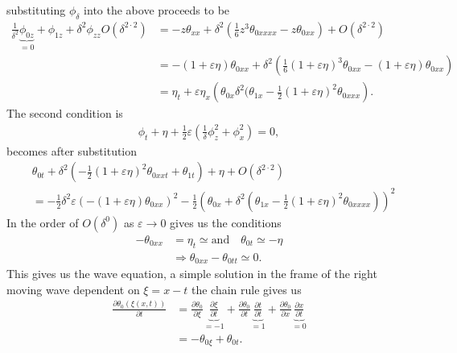 substituting $\phi_\delta$ into the above proceeds to be
\begin{align}
    \frac{1}{\delta^2}\underbrace{\phi_{0z}}_{=0} + \phi_{1z}+ \delta^2\phi_{zz}
    O(\delta^{2\cdot 2})
    &= -z\theta_{x x} + \delta^2\left( \frac{1}{6}z^3\theta_{0 x x x x} - z
    \theta_{0x x} \right) + O(\delta^{2\cdot 2})\\
    &=-(1+\varepsilon\eta)\theta_{0 x x} + \delta^2\left(
    \frac{1}{6}(1+\varepsilon\eta)^3\theta_{0 x x} -
(1+\varepsilon\eta)\theta_{0 x x} \right) \label{eq:soliton-scale-boundary1}\\
    &= \eta_t + \varepsilon\eta_x \left(
        \theta_{0x}
    \delta^2(\theta_{1x}-\frac{1}{2}( 1+ \varepsilon\eta)^2 \theta_{0x x
    x}\label{eq:soliton-scale-boundary2}
\right).
\end{align}
The second condition is
\begin{align}
    \phi_t + \eta + \frac{1}{2}\varepsilon \left( \frac{1}{\delta}\phi^2_z
    +\phi_x^2\right)  = 0,
\end{align}
becomes after substitution
\begin{align}
    &\theta_{0t}+ \delta^2\left( -\frac{1}{2}(1+\varepsilon\eta)^2\theta_{0 x xt}
    + \theta_{1t}\right) + \eta + O(\delta^{2\cdot 2})
\label{eq:soliton-scale-boundary3}
    \\&=-\frac{1}{2}\delta^2\varepsilon(-(1+\varepsilon\eta)\theta_{0 x x
    })^2\label{eq:soliton-scale-boundary4}
    -\frac{1}{2}\left( \theta_{0 x} + \delta^2\left( \theta_{1x} -
    \frac{1}{2}(1+\varepsilon\eta)^2\theta_{0 x x x x}  \right)  \right) ^2
\end{align}
In the order of $O(\delta^{0})$ as $\varepsilon \rightarrow 0$ gives us the conditions
\begin{align}
    -\theta_{0 x x} &= \eta_t \simeq \text{and}\quad
    \theta_{0t}\simeq-\eta\label{eq:solitonO0}\\
    &\Rightarrow \theta_{0 x x} - \theta_{0 t t} \simeq 0.
\end{align}
This gives us the wave equation, a simple solution in the frame of the right
moving wave dependent on $\xi = x -t$ the chain rule gives us
\begin{align}
    \frac{\partial \theta_0(\xi(x, t))}{\partial t}
    &= \frac{\partial
    \theta_0}{\partial \xi} \underbrace{\frac{\partial \xi}{\partial t}}_{=-1}
    + \frac{\partial
    \theta_0}{\partial t} \underbrace{\frac{\partial t}{\partial t}}_{=1}
        + \frac{\partial \theta_0}{\partial x} \underbrace{\frac{\partial
        x}{\partial t}}_{=0}\\
    &=-\theta_{0\xi}+\theta_{0t}.
\end{align}
